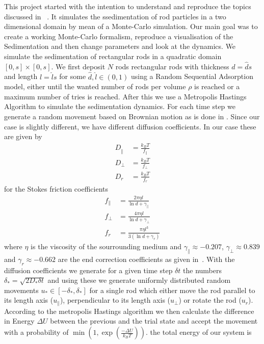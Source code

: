 This project started with the intention to understand and reproduce the topics discussed in ~\cite{SED}. It simulates the ssedimentation of rod particles in a two dimensional domain by mean of a Monte-Carlo simulation. Our main goal was to create a working Monte-Carlo formalism, reproduce a visualisation of the Sedimentation and then change parameters and look at the dynamics.
We simulate the sedimentation of rectangular rods in a quadratic domain $[0,s]×[0,s]$. We first deposit $N$ rods rectangular rods with thickness $d = \hat ds$ and length $l = \hat ls$ for some $\hat d,\hat l∈(0,1)$ using a Random Sequential Adsorption model, either until the wanted number of rods per volume $ρ$ is reached or a maximum number of tries is reached. After this we use a Metropolis Hastings Algorithm to simulate the sedimentation dynamics. For each time step we generate a random movement based on Brownian motion as is done in \cite{BD}. Since our case is slightly different, we have different diffusion coefficients. In our case these are given by
\begin{equation}
  \begin{array}{RLL}
    D_‖ &= \frac{k_BT}{f_\|}\\
    D_\perp &= \frac{k_BT}{f_\perp}\\
    D_r &= \frac{k_BT}{f_r}
  \end{array}
\end{equation}
for the Stokes friction coefficients
\begin{equation}
  \begin{array}{RLL}
    f_\| &= \frac{2πηl}{\ln d + γ_\|}\\
    f_\perp &= \frac{4πηl}{\ln d + γ_\perp}\\
    f_r &= \frac{πηl^3}{3(\ln d+γ_r)}
  \end{array}
\end{equation}
where $η$ is the viscosity of the sourrounding medium and $γ_\| \approx -0.207$, $γ_\perp\approx0.839$ and $γ_r\approx-0.662$ are the end correction coefficients as given in~\cite{SED}.
With the diffusion coefficients we generate for a given time step $δt$ the numbers $δ_* = \sqrt{2D_*δt}$ and using these we generate uniformly distributed random movements $u_*∈[-δ_*,δ_*]$ for a single rod which either move the rod parallel to its length axis ($u_\|$), perpendicular to its length axis ($u_\perp$) or rotate the rod ($u_r$). According to the metropolis Hastings algorithm we then calculate the difference in Energy $ΔU$ between the previous and the trial state and accept the movement with a probability of $\min(1,\exp(\frac{-ΔU}{k_BT}))$. the total energy of our system is
